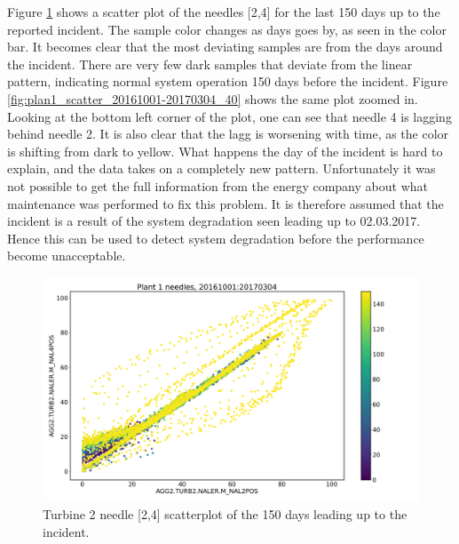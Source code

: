        Figure \ref{fig:plan1_scatter_20161001-20170304} shows a scatter plot of the needles [2,4] for the last 150 days up to the reported incident. The sample color changes as days goes by, as seen in the color bar. It becomes clear that the most deviating samples are from the days around the incident. There are very few dark samples that deviate from the linear pattern, indicating normal system operation 150 days before the incident. Figure \ref{fig:plan1_scatter_20161001-20170304_40} shows the same plot zoomed in. Looking at the bottom left corner of the plot, one can see that needle 4 is lagging behind needle 2. It is also clear that the lagg is worsening with time, as the color is shifting from dark to yellow. What happens the day of the incident is hard to explain, and the data takes on a completely new pattern. Unfortunately it was not possible to get the full information from the energy company about what maintenance was performed to fix this problem. It is therefore assumed that the incident is a result of the system degradation seen leading up to 02.03.2017. Hence this can be used to detect system degradation before the performance become unacceptable.     
        \begin{figure}
            \centering
            \includegraphics[width=\textwidth]{report/figures/analysis/plant1_error/needle_2_4_20161001-20170304_dots.png}
            \caption{Turbine 2 needle [2,4] scatterplot of the 150 days leading up to the incident.}
            \label{fig:plan1_scatter_20161001-20170304}
        \end{figure}
        

